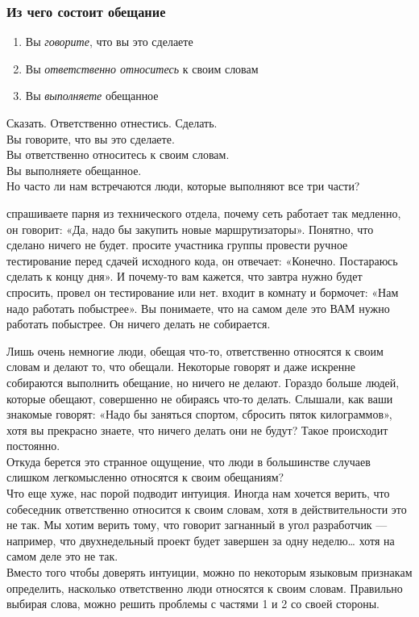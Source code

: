 \documentclass{../industrial-development}
\begin{document}
\begin{frame} \frametitle{Из чего состоит обещание}
\begin{enumerate}
	\item Вы \textit{говорите}, что вы это сделаете
	\item Вы \textit{ответственно относитесь} к своим словам
	\item Вы \textit{выполняете} обещанное
\end{enumerate}
\end{frame}
\lecturenotes
Сказать. Ответственно отнестись. Сделать.\\
Вы говорите, что вы это сделаете.\\
Вы ответственно относитесь к своим словам.\\
Вы выполняете обещанное.\\
Но часто ли нам встречаются люди, которые
выполняют все три части?\\
\begin{itemize}
 спрашиваете парня из технического отдела, почему сеть работает так медленно, он говорит: «Да, надо бы закупить новые маршрутизаторы». Понятно, что сделано ничего не будет.
 просите участника группы провести ручное тестирование перед сдачей исходного кода, он отвечает: «Конечно. Постараюсь сделать к концу дня». И почему-то вам кажется, что завтра нужно будет спросить, провел он тестирование или нет.
 входит в комнату и бормочет: «Нам надо работать побыстрее». Вы понимаете, что на самом деле это ВАМ нужно работать побыстрее. Он ничего делать не собирается.
\end{itemize}
Лишь очень немногие люди, обещая что-то, ответственно относятся к своим словам и делают то, что обещали. Некоторые говорят и даже искренне собираются выполнить обещание, но ничего не делают. Гораздо больше людей, которые обещают, совершенно не  обираясь что-то делать. Слышали, как ваши знакомые говорят: «Надо бы заняться спортом, сбросить пяток килограммов», хотя вы прекрасно знаете, что ничего делать они не будут? Такое происходит постоянно.\\
Откуда берется это странное ощущение, что люди в большинстве случаев слишком легкомысленно относятся к своим обещаниям?\\
Что еще хуже, нас порой подводит интуиция. Иногда нам хочется верить, что собеседник ответственно относится к своим словам, хотя в действительности это не так. Мы хотим верить тому, что говорит загнанный в угол разработчик — например, что двухнедельный проект будет завершен за одну неделю… хотя на самом деле это не так.\\
Вместо того чтобы доверять интуиции, можно по некоторым языковым признакам определить, насколько ответственно люди относятся
к своим словам. Правильно выбирая слова, можно решить проблемы с частями 1 и 2 со своей стороны.
\end{document}
